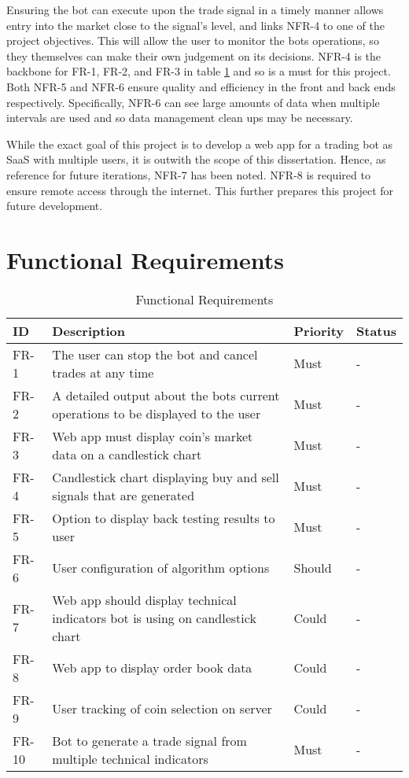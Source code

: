 Ensuring the bot can execute upon the trade signal in a timely manner allows entry into the market close to the signal's level, and links NFR-4 to one of the project objectives. This will allow the user to monitor the bots operations, so they themselves can make their own judgement on its decisions. NFR-4 is the backbone for FR-1, FR-2, and FR-3 in table \ref{table:requirements:func} and so is a must for this project. Both NFR-5 and NFR-6 ensure quality and efficiency in the front and back ends respectively. Specifically, NFR-6 can see large amounts of data when multiple intervals are used and so data management clean ups may be necessary.

While the exact goal of this project is to develop a web app for a trading bot as SaaS with multiple users, it is outwith the scope of this dissertation. Hence, as reference for future iterations, NFR-7 has been noted. NFR-8 is required to ensure remote access through the internet. This further prepares this project for future development.



\section{Functional Requirements}
\label{sec:requirements:unc}



\begin{table}[htb!]
\centering
\begin{tabular}{|l|p{}|l|l|}
\hline
\textbf{ID} & \textbf{Description} & \textbf{Priority} & \textbf{Status} \\ \hline\hline
FR-1 & The user can stop the bot and cancel trades at any time & Must & - \\ \hline
FR-2 & A detailed output about the bots current operations to be displayed to the user & Must & - \\ \hline
FR-3 & Web app must display coin's market data on a candlestick chart & Must & - \\\hline
FR-4 & Candlestick chart displaying buy and sell signals that are generated & Must & - \\\hline
FR-5 & Option to display back testing results to user & Must & - \\ \hline
FR-6 & User configuration of algorithm options & Should & - \\ \hline
FR-7 & Web app should display technical indicators bot is using on candlestick chart & Could & - \\\hline
FR-8 & Web app to display order book data & Could & - \\\hline
FR-9 & User tracking of coin selection on server & Could & - \\ \hline
FR-10 & Bot to generate a trade signal from multiple technical indicators & Must & - \\ \hline
\end{tabular}
\caption{Functional Requirements}
\label{table:requirements:func}
\end{table}


